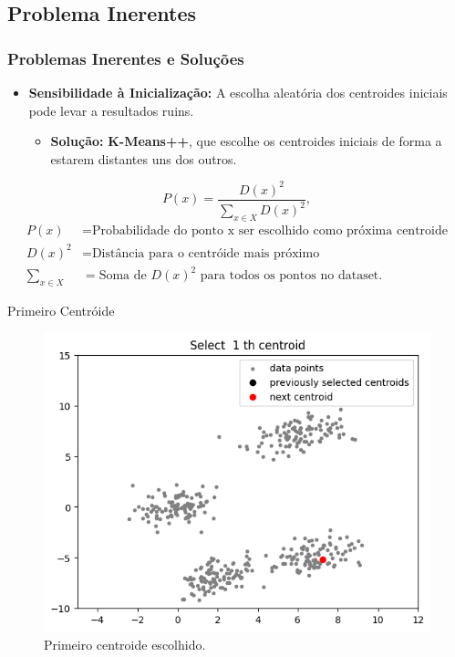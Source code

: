 \documentclass{beamer}
\begin{document}
\subsection{Problema Inerentes}
\begin{frame}
    \frametitle{Problemas Inerentes e Soluções}
    \begin{itemize}
        \item \textbf{Sensibilidade à Inicialização:} A escolha aleatória dos centroides iniciais pode levar a resultados ruins.
        \begin{itemize}
            \item \textbf{Solução:} \textbf{K-Means++}, que escolhe os centroides iniciais de forma a estarem distantes uns dos outros.
        \end{itemize}

    \end{itemize}

    \begin{equation}
    P(x) = \frac{D(x)^2}{\sum_{x \in X} D(x)^2},
\end{equation}   
\begin{align*}
    P(x) &= \text{Probabilidade do ponto x ser escolhido como próxima centroide} \\
    D(x)^2 &= \text{Distância para o centróide mais próximo} \\
    \sum_{x \in X} &= \text{Soma de ${D(x)^2}$ para todos os pontos no dataset.}
\end{align*}
\end{frame}
\begin{frame}{Primeiro Centróide}
    \begin{figure}
        \centering
        \includegraphics[width=0.7\linewidth]{imagens/kmeans_1.png}
        \caption{Primeiro centroide escolhido\cite{geeksforgeeks_kmeans}.}
        \label{fig:centroide1}
    \end{figure}
\end{frame}
\end{document}
